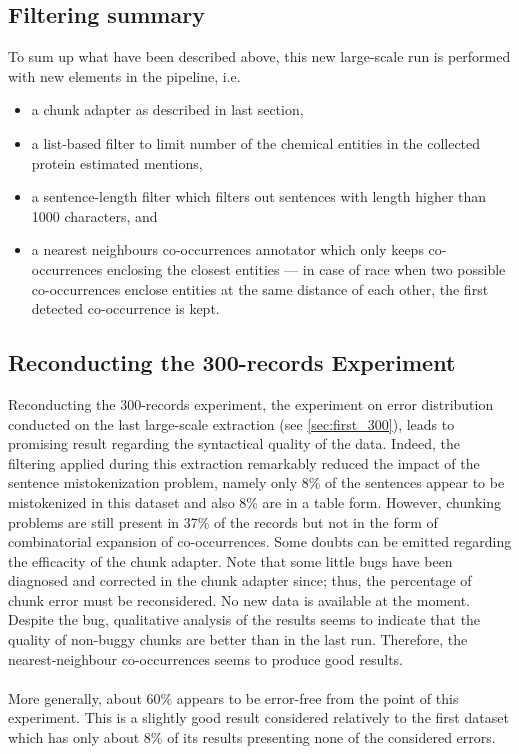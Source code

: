 \documentclass{report}
\begin{document}
		\subsection{Filtering summary}
		To sum up what have been described above, this new large-scale run is performed with new elements in the pipeline, i.e.
		\begin{itemize}
			\item a chunk adapter as described in last section,
			\item a list-based filter to limit number of the chemical entities in
			the collected protein estimated mentions,
			\item a sentence-length filter which filters out sentences with length
			higher than 1000 characters, and
			\item a nearest neighbours co-occurrences annotator which only keeps 
			co-occurrences enclosing the closest entities --- in case of race when
			two possible co-occurrences enclose entities at the same distance of 
			each other, the first detected co-occurrence is kept.
		\end{itemize}
		
		\subsection{Reconducting the 300-records Experiment} 
		Reconducting the 300-records experiment, the experiment on error distribution conducted on the last large-scale extraction (see \ref{sec:first_300}), leads to promising result regarding
		the syntactical quality of the data. Indeed, the filtering applied during this extraction remarkably reduced the impact of the
		sentence mistokenization problem, namely only 8\% of the sentences appear to be mistokenized in this dataset and also 8\% are
		in a table form. However, chunking problems are still present in 37\% of the records but not in the form of combinatorial expansion of co-occurrences. Some
		doubts can be emitted regarding the efficacity of the chunk adapter. 
		Note that some little bugs have been diagnosed and corrected in the chunk
		adapter since; thus, the percentage of chunk error must be reconsidered.
		No new data is available at the moment. Despite the bug, qualitative analysis of the results
		seems to indicate that the quality of non-buggy chunks are better than
		in the last run. Therefore, the nearest-neighbour co-occurrences seems
		to produce good results.
		
		\paragraph{}More generally, about 60\% appears to be error-free 
		from the point of this experiment. This is a slightly good result 
		considered relatively to the first dataset which has only about 8\% of its
		results presenting none of the considered errors.
		
\end{document}
